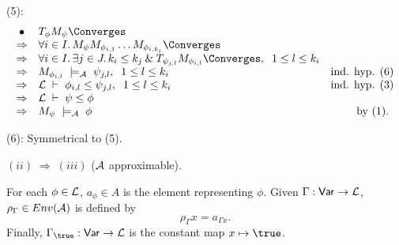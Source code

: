 \noindent (5):
\[  \begin{array}{clr}
\bullet & T_{\phi} M_{\psi} {\Converges} & \\ 
\Rightarrow & \forall i \in I . \, M_{\psi} M_{\phi_{i, 1}} \ldots M_{\phi_{i, k_{i}}} {\Converges} & \\
\Rightarrow & \forall i \in I . \, \exists j \in J . \, k_{i} \leq k_{j} \: \& \: T_{\psi_{j, l}} M_{\phi_{i, l}} \Converges , \;\; 1 \leq l \leq k_{i} & \\
\Rightarrow &  M_{\phi_{i, l}} \; \models_{\cal A} \; \psi_{j, l} , \;\; 1 \leq l \leq k_{i} & \mbox{ind. hyp. (6)} \\
\Rightarrow & {\cal L} \; \vdash \; \phi_{i, l} \leq \psi_{j, l} , \;\; 1 \leq l \leq k_{i} & \mbox{ind. hyp. (3)} \\
\Rightarrow & {\cal L} \; \vdash \; \psi \leq \phi  & \\ 
\Rightarrow &  M_{\psi} \; \models_{\cal A} \; \phi & \mbox{by (1). } 
\end{array} \]

\noindent (6): Symmetrical to (5).

\noindent $(ii) \; \Longrightarrow \; (iii)$ ($\cal A$ approximable). 

 For each $\phi \in {\cal L}$, $a_{\phi} \in A$ is the element representing $\phi$. Given $\Gamma : {\sf Var} \rightarrow {\cal L}$, $\rho_{\Gamma} \in Env({\cal A})$ is defined by
\[ \rho_{\Gamma} x = a_{\Gamma x} . \]
Finally, $\Gamma_{\true} : {\sf Var} \rightarrow {\cal L}$ is the constant map $x \mapsto \true$.

